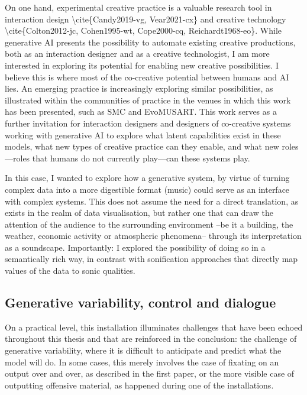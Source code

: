 On one hand, experimental creative practice is a valuable research tool in interaction design \textbackslash{}cite\{Candy2019-vg, Vear2021-cx\} and creative technology \textbackslash{}cite\{Colton2012-jc, Cohen1995-wt, Cope2000-cq, Reichardt1968-eo\}. While generative AI presents the possibility to automate existing creative productions, both as an interaction designer and as a creative technologist, I am more interested in exploring its potential for enabling new creative possibilities. I believe this is where most of the co-creative potential between humans and AI lies. An emerging practice is increasingly exploring similar possibilities, as illustrated within the communities of practice in the venues in which this work has been presented, such as SMC and EvoMUSART. This work serves as a further invitation for interaction designers and designers of co-creative systems working with generative AI to explore what latent capabilities exist in these models, what new types of creative practice can they enable, and what new roles—roles that humans do not currently play—can these systems play.

In this case, I wanted to explore how a generative system, by virtue of turning complex data into a more digestible format (music) could serve as an interface with complex systems. This does not assume the need for a direct translation, as exists in the realm of data visualisation, but rather one that can draw the attention of the audience to the surrounding environment --be it a building, the weather, economic activity or atmospheric phenomena-- through its interpretation as a soundscape. Importantly: I explored the possibility of doing so in a semantically rich way, in contrast with sonification approaches that directly map values of the data to sonic qualities. 

\subsection{Generative variability, control and dialogue}

On a practical level, this installation illuminates challenges that have been echoed throughout this thesis and that are reinforced in the conclusion: the challenge of generative variability, where it is difficult to anticipate and predict what the model will do. In some cases, this merely involves the case of fixating on an output over and over, as described in the first paper, or the more visible case of outputting offensive material, as happened during one of the installations.

